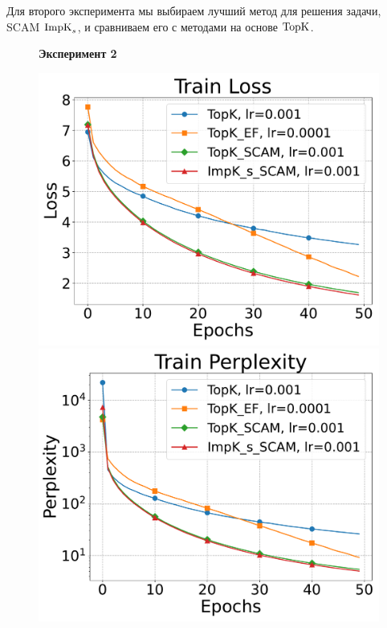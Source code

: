     Для второго эксперимента мы выбираем лучший метод для решения задачи, SCAM $\operatorname{ImpK}_s$, и сравниваем его с методами на основе $\operatorname{TopK}$.

    \begin{figure}[ht]
        \centering
        \textbf{Эксперимент 2}\par\medskip
        \begin{minipage}{0.45\textwidth}
            \includegraphics[width=\textwidth]{figures/gpt2/experiment2/Train Loss.pdf}
        \end{minipage}
        \begin{minipage}{0.45\textwidth}
            \includegraphics[width=\textwidth]{figures/gpt2/experiment2/Train Perplexity.pdf}

\end{minipage}
\end{figure}
